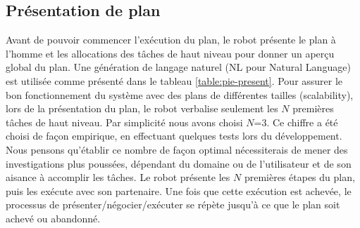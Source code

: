 \documentclass[a4paper,11pt,twoside]{StyleThese}
\begin{document}
\subsection{Présentation de plan}

Avant de pouvoir commencer l'exécution du plan, le robot présente le plan à l'homme et les allocations des tâches de haut niveau pour donner un aperçu global du plan. Une génération de langage naturel (NL pour Natural Language) est utilisée comme présenté dans le tableau \ref{table:pie-present}. 
Pour assurer le bon fonctionnement du système avec des plans de différentes tailles (scalability), lors de la présentation du plan, le robot verbalise seulement les  $N$ premières tâches de haut niveau. Par simplicité nous avons choisi $N$=$3$. Ce chiffre a été choisi de façon empirique, en effectuant quelques tests lors du développement. Nous pensons qu'établir ce nombre de façon optimal nécessiterais de mener des investigations plus poussées, dépendant du domaine ou de l'utilisateur et de son aisance à accomplir les tâches. Le robot présente les $N$ premières étapes du plan, puis les exécute avec son partenaire. Une fois que cette exécution est achevée, le processus de présenter/négocier/exécuter se répète jusqu'à ce que le plan soit achevé ou abandonné.


 
\end{document}
